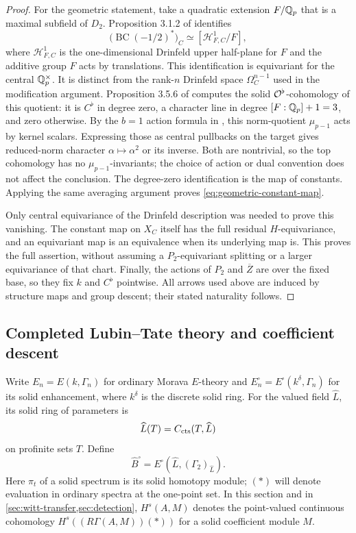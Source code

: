 \begin{proof}
For the geometric statement, take a quadratic extension $F/\mathbb Q_p$ that
is a maximal subfield of $D_2$.  Proposition 3.1.2 of \cite{BMR2026}
identifies
\[
 \bigl(\operatorname{BC}(-1/2)^*\bigr)_C
 \simeq[\mathcal H^1_{F,C}/F],
\]
where $\mathcal H^1_{F,C}$ is the one-dimensional Drinfeld upper
half-plane for $F$ and the additive group $F$ acts by translations.
This identification is equivariant for the central $\mathbb Q_p^{\times}$.
It is distinct from the rank-$n$ Drinfeld space
$\Omega_C^{n-1}$ used in the modification argument.
Proposition 3.5.6 of \cite{BMR2026} computes the solid
$\mathcal O^{\flat}$-cohomology of this quotient: it is $C^{\flat}$ in degree
zero, a character line in degree $[F:\mathbb Q_p]+1=3$, and zero otherwise.
By the $b=1$ action formula in , this norm-quotient
$\mu_{p-1}$ acts by kernel scalars.  Expressing those as central
pullbacks on the target gives reduced-norm character
$\alpha\mapsto\alpha^2$ or its inverse.  Both are nontrivial, so the
top cohomology has no $\mu_{p-1}$-invariants; the choice of action or
dual convention does not affect the conclusion.
The degree-zero identification is the map of constants.  Applying the
same averaging argument proves \eqref{eq:geometric-constant-map}.

Only central equivariance of the Drinfeld description was needed to
prove this vanishing.  The constant map on $X_C$ itself has the full
residual $H$-equivariance, and an equivariant map is an equivalence when
its underlying map is.  This proves the full assertion, without assuming
a $P_2$-equivariant splitting or a larger equivariance of that chart.
Finally, the actions of $P_2$ and $\overline Z$ are over the fixed base,
so they fix $k$ and $C^{\flat}$ pointwise.  All arrows used above are
induced by structure maps and group descent; their stated naturality
follows.
\end{proof}

\subsection{Completed Lubin--Tate theory and coefficient descent}

Write $E_n=E(k,\Gamma_n)$ for ordinary Morava $E$-theory and
$E_n^{\square}=E^{\square}(k^{\delta},\Gamma_n)$ for its solid
enhancement, where $k^{\delta}$ is the discrete solid ring.  For the
valued field $\widehat L$, its solid ring of parameters is
\[
 \widehat L(T)=C_{\mathrm{cts}}(T,\widehat L)
\]
on profinite sets $T$.  Define
\[
 \widehat B^{\square}
   =E^{\square}(\widehat L,(\Gamma_2)_{\widehat L}).
\]
Here $\pi_t$ of a solid spectrum is its solid homotopy module; $(*)$
will denote evaluation in ordinary spectra at the one-point set.
In this section and in \cref{sec:witt-transfer,sec:detection},
$H^s(A,M)$ denotes the point-valued continuous cohomology
$H^s((R\Gamma(A,M))(*))$ for a solid coefficient module $M$.

